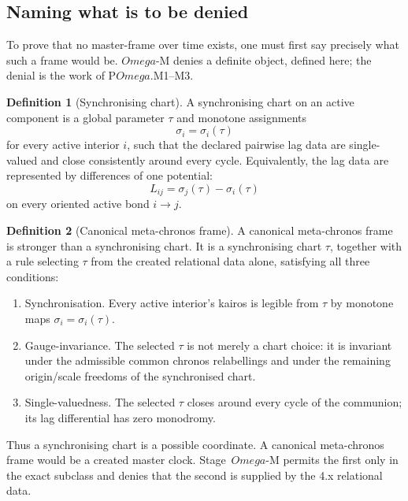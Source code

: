 \documentclass[11pt,a4paper]{article}
\def\Omega{Omega}%
\def\emph#1{#1}%
\theoremstyle{definition}
\newtheorem{definition}{Definition}[section]
\theoremstyle{plain}
\theoremstyle{remark}
\begin{document}
\subsection{Naming what is to be denied}

To prove that no master-frame over time exists, one must first say precisely what such a frame
would be. $\Omega$-M denies a definite object, defined here; the denial is the work of
P$\Omega$.M1--M3.

\begin{definition}[Synchronising chart]\label{def:syncchart}
A \emph{synchronising chart} on an active component is a global parameter \(\tau\)
and monotone assignments
\[
\sigma_i=\sigma_i(\tau)
\]
for every active interior \(i\), such that the declared pairwise lag data are
single-valued and close consistently around every cycle. Equivalently, the lag
data are represented by differences of one potential:
\[
L_{ij}=\sigma_j(\tau)-\sigma_i(\tau)
\]
on every oriented active bond \(i\to j\).
\end{definition}

\begin{definition}[Canonical meta-chronos frame]\label{def:metaframe}
A \emph{canonical meta-chronos frame} is stronger than a synchronising chart. It is
a synchronising chart \(\tau\), together with a rule selecting \(\tau\) from the
created relational data alone, satisfying all three conditions:
\begin{enumerate}[label=\textup{(\roman*)},leftmargin=1.2cm]
\item \emph{Synchronisation.} Every active interior's kairos is legible from
\(\tau\) by monotone maps \(\sigma_i=\sigma_i(\tau)\).

\item \emph{Gauge-invariance.} The selected \(\tau\) is not merely a chart choice:
it is invariant under the admissible common chronos relabellings and under the
remaining origin/scale freedoms of the synchronised chart.

\item \emph{Single-valuedness.} The selected \(\tau\) closes around every cycle of
the communion; its lag differential has zero monodromy.
\end{enumerate}
Thus a synchronising chart is a possible coordinate. A canonical meta-chronos frame
would be a created master clock. Stage~\(\Omega\)-M permits the first only in the
exact subclass and denies that the second is supplied by the 4.x relational data.
\end{definition}
\end{document}
